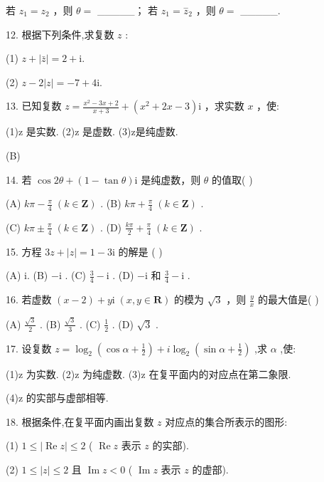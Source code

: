 \documentclass[10pt]{article}
\newcommand*\circled[1]{\tikz[baseline=(char.base)]{\node[shape=circle,draw,inner sep=1.5pt] (char) {\small #1};}}
\begin{document}
 \circled{1} 若 \({z}_{1} = {z}_{2}\) ，则 \(\theta  =\) \_\_\_\_\_； \circled{2} 若 \({z}_{1} = {\overset{ - }{z}}_{2}\) ，则 \(\theta  =\) \_\_\_\_\_.

12. 根据下列条件,求复数 \(z\) :

(1) \(z + \left| \bar{z}\right|  = 2 + \mathrm{i}.\)

(2) \(z - 2\left| z\right|  =  - 7 + 4\mathrm{i}.\)

13. 已知复数 \(z = \frac{{x}^{2} - {3x} + 2}{x + 3} + \left( {{x}^{2} + {2x} - 3}\right) \mathrm{i}\) ，求实数 \(x\) ，使:

(1)z 是实数. (2)z 是虚数. (3)z是纯虚数.

(B)

14. 若 \(\cos {2\theta } + \left( {1 - \tan \theta }\right) \mathrm{i}\) 是纯虚数，则 \(\theta\) 的值取( )

(A) \({k\pi } - \frac{\pi }{4}\;\left( {k \in  \mathbf{Z}}\right)\) . (B) \({k\pi } + \frac{\pi }{4}\;\left( {k \in  \mathbf{Z}}\right)\) .

(C) \({k\pi } \pm  \frac{\pi }{4}\;\left( {k \in  \mathbf{Z}}\right)\) . (D) \(\frac{k\pi }{2} + \frac{\pi }{4}\;\left( {k \in  \mathbf{Z}}\right)\) .

15. 方程 \({3z} + \left| z\right|  = 1 - 3\mathrm{i}\) 的解是 ( )

(A) i. (B) \(- \mathrm{i}\) . (C) \(\frac{3}{4} - \mathrm{i}\) . (D) \(- \mathrm{i}\) 和 \(\frac{3}{4} - \mathrm{i}\) .

16. 若虚数 \(\left( {x - 2}\right)  + y\mathrm{i}\;\left( {x,y \in  \mathbf{R}}\right)\) 的模为 \(\sqrt{3}\) ，则 \(\frac{y}{x}\) 的最大值是( )

(A) \(\frac{\sqrt{3}}{2}\) . (B) \(\frac{\sqrt{3}}{3}\) . (C) \(\frac{1}{2}\) . (D) \(\sqrt{3}\) .

17. 设复数 \(z = {\log }_{2}\left( {\cos \alpha  + \frac{1}{2}}\right)  + i{\log }_{2}\left( {\sin \alpha  + \frac{1}{2}}\right)\) ,求 \(\alpha\) ,使:

(1)z 为实数. (2)z 为纯虚数. (3)z 在复平面内的对应点在第二象限.

(4)z 的实部与虚部相等.

18. 根据条件,在复平面内画出复数 \(z\) 对应点的集合所表示的图形:

(1) \(1 \leq  \left| {\operatorname{Re}z}\right|  \leq  2\) ( \(\operatorname{Re}z\) 表示 \(z\) 的实部).

(2) \(1 \leq  \left| z\right|  \leq  2\) 且 \(\operatorname{Im}z < 0\) ( \(\operatorname{Im}z\) 表示 \(z\) 的虚部).
\end{document}
